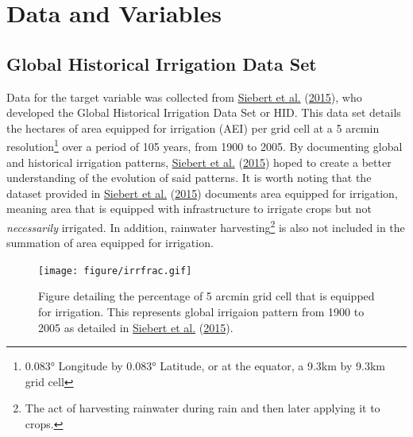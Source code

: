 \documentclass[12pt,twoside]{reedthesis}
\begin{document}
\hypertarget{datavar}{%
\chapter{Data and Variables}\label{datavar}}

\hypertarget{HID}{%
\section{Global Historical Irrigation Data Set}\label{HID}}

Data for the target variable was collected from \protect\hyperlink{ref-siebertGlobalDataSet2015}{Siebert et al.} (\protect\hyperlink{ref-siebertGlobalDataSet2015}{2015}), who developed the Global Historical Irrigation Data Set or HID. This data set details the hectares of area equipped for irrigation (AEI) per grid cell at a 5 arcmin resolution\footnote{0.083° Longitude by 0.083° Latitude, or at the equator, a 9.3km by 9.3km grid cell} over a period of 105 years, from 1900 to 2005. By documenting global and historical irrigation patterns, \protect\hyperlink{ref-siebertGlobalDataSet2015}{Siebert et al.} (\protect\hyperlink{ref-siebertGlobalDataSet2015}{2015}) hoped to create a better understanding of the evolution of said patterns. It is worth noting that the dataset provided in \protect\hyperlink{ref-siebertGlobalDataSet2015}{Siebert et al.} (\protect\hyperlink{ref-siebertGlobalDataSet2015}{2015}) documents area equipped for irrigation, meaning area that is equipped with infrastructure to irrigate crops but not \emph{necessarily} irrigated. In addition, rainwater harvesting\footnote{The act of harvesting rainwater during rain and then later applying it to crops.} is also not included in the summation of area equipped for irrigation.
\begin{figure}
\centering
\texttt{[image: figure/irrfrac.gif]}
\caption{\label{fig:irrfracgif} Figure detailing the percentage of 5 arcmin grid cell that is equipped for irrigation. This represents global irrigaion pattern from 1900 to 2005 as detailed in \protect\hyperlink{ref-siebertGlobalDataSet2015}{Siebert et al.} (\protect\hyperlink{ref-siebertGlobalDataSet2015}{2015}).}
\end{figure}
\end{document}
